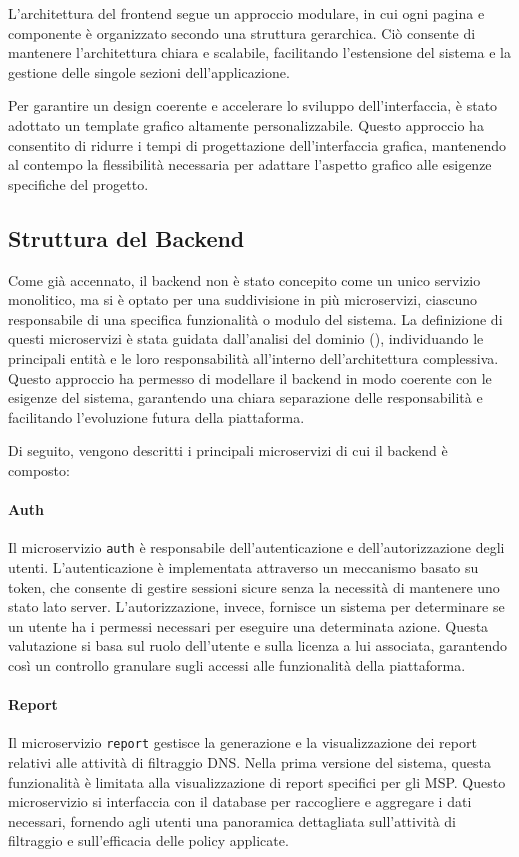 L'architettura del frontend segue un approccio modulare, in cui ogni pagina e componente è organizzato secondo una struttura gerarchica. Ciò consente di mantenere l'architettura chiara e scalabile, facilitando l'estensione del sistema e la gestione delle singole sezioni dell'applicazione.

Per garantire un design coerente e accelerare lo sviluppo dell'interfaccia, è stato adottato un template grafico altamente personalizzabile. Questo approccio ha consentito di ridurre i tempi di progettazione dell’interfaccia grafica, mantenendo al contempo la flessibilità necessaria per adattare l’aspetto grafico alle esigenze specifiche del progetto.

\subsection{Struttura del Backend}
Come già accennato, il backend non è stato concepito come un unico servizio monolitico, ma si è optato per una suddivisione in più microservizi, ciascuno responsabile di una specifica funzionalità o modulo del sistema. La definizione di questi microservizi è stata guidata dall'analisi del dominio (), individuando le principali entità e le loro responsabilità all'interno dell'architettura complessiva. Questo approccio ha permesso di modellare il backend in modo coerente con le esigenze del sistema, garantendo una chiara separazione delle responsabilità e facilitando l'evoluzione futura della piattaforma.

Di seguito, vengono descritti i principali microservizi di cui il backend è composto:
\paragraph{Auth}
Il microservizio \texttt{auth} è responsabile dell'autenticazione e dell'autorizzazione degli utenti. L'autenticazione è implementata attraverso un meccanismo basato su token, che consente di gestire sessioni sicure senza la necessità di mantenere uno stato lato server.
L'autorizzazione, invece, fornisce un sistema per determinare se un utente ha i permessi necessari per eseguire una determinata azione. Questa valutazione si basa sul ruolo dell'utente e sulla licenza a lui associata, garantendo così un controllo granulare sugli accessi alle funzionalità della piattaforma.

\paragraph{Report}
Il microservizio \texttt{report} gestisce la generazione e la visualizzazione dei report relativi alle attività di filtraggio DNS. Nella prima versione del sistema, questa funzionalità è limitata alla visualizzazione di report specifici per gli MSP. Questo microservizio si interfaccia con il database per raccogliere e aggregare i dati necessari, fornendo agli utenti una panoramica dettagliata sull'attività di filtraggio e sull'efficacia delle policy applicate.

